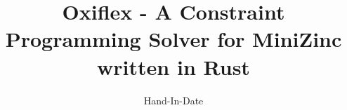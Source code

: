 \documentclass[a4paper, 10pt, oneside]{memoir}
\title				{Oxiflex - A Constraint Programming Solver for MiniZinc written in Rust}
\date				{Hand-In-Date}
\begin{document}

\thesisfront
\maketitle
\pagestyle{thesis}
% 

\thesistoc
\thesismain






\thesisappendix
\thesisbib
\begin{appendices}
	
\end{appendices}
\thesisback
{}
{}
{}
\end{document}
